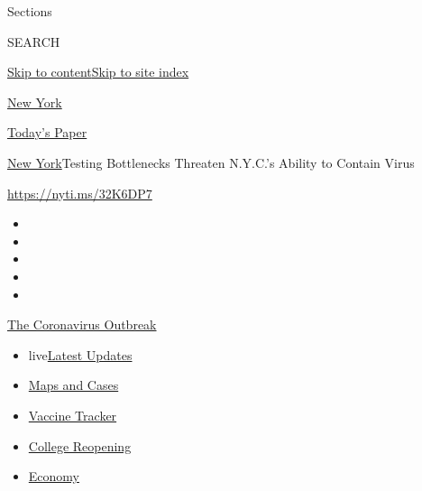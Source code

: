 Sections

SEARCH

\protect\hyperlink{site-content}{Skip to
content}\protect\hyperlink{site-index}{Skip to site index}

\href{https://www.nytimes.com/section/nyregion}{New York}

\href{https://myaccount.nytimes.com/auth/login?response_type=cookie\&client_id=vi}{}

\href{https://www.nytimes.com/section/todayspaper}{Today's Paper}

\href{/section/nyregion}{New York}\textbar{}Testing Bottlenecks Threaten
N.Y.C.'s Ability to Contain Virus

\url{https://nyti.ms/32K6DP7}

\begin{itemize}
\item
\item
\item
\item
\item
\end{itemize}

\href{https://www.nytimes.com/news-event/coronavirus?action=click\&pgtype=Article\&state=default\&region=TOP_BANNER\&context=storylines_menu}{The
Coronavirus Outbreak}

\begin{itemize}
\tightlist
\item
  live\href{https://www.nytimes.com/2020/08/04/world/coronavirus-covid-19.html?action=click\&pgtype=Article\&state=default\&region=TOP_BANNER\&context=storylines_menu}{Latest
  Updates}
\item
  \href{https://www.nytimes.com/interactive/2020/us/coronavirus-us-cases.html?action=click\&pgtype=Article\&state=default\&region=TOP_BANNER\&context=storylines_menu}{Maps
  and Cases}
\item
  \href{https://www.nytimes.com/interactive/2020/science/coronavirus-vaccine-tracker.html?action=click\&pgtype=Article\&state=default\&region=TOP_BANNER\&context=storylines_menu}{Vaccine
  Tracker}
\item
  \href{https://www.nytimes.com/2020/08/02/us/covid-college-reopening.html?action=click\&pgtype=Article\&state=default\&region=TOP_BANNER\&context=storylines_menu}{College
  Reopening}
\item
  \href{https://www.nytimes.com/live/2020/08/03/business/stock-market-today-coronavirus?action=click\&pgtype=Article\&state=default\&region=TOP_BANNER\&context=storylines_menu}{Economy}
\end{itemize}

